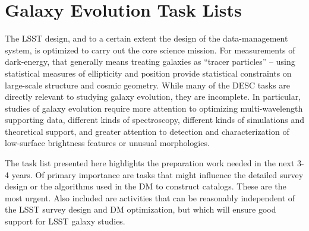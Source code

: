 
\section{Galaxy Evolution Task Lists}\label{sec:tasks:gal:intro}  

The LSST design, and to a certain extent the design of the data-management
system, is optimized to carry out the core science mission. For measurements
of dark-energy, that generally means treating galaxies as ``tracer particles'' --
using statistical measures of ellipticity and position provide statistical
constraints on large-scale structure and cosmic geometry. While many of the
DESC tasks are directly relevant to studying galaxy evolution, they are 
incomplete. In particular, studies of galaxy evolution require more attention to 
optimizing multi-wavelength supporting data, different kinds of spectroscopy, different
kinds of simulations and theoretical support, and greater attention to detection
and characterization of low-surface brightness features or unusual morphologies.

The task list presented here highlights the preparation work needed in the next 3-4
years. Of primary importance are tasks that might influence the detailed survey
design or the algorithms used in the DM to construct catalogs. These are the most
urgent. Also included are activities that can be reasonably independent of the
LSST survey design and DM optimization, but which will ensure good support for
LSST galaxy studies.


